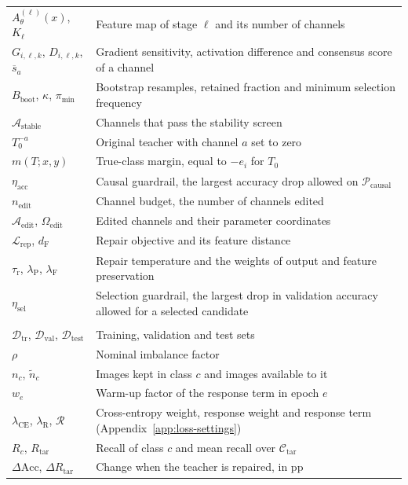 \documentclass[review,number,sort&compress]{elsarticle}
\theoremstyle{definition}
\begin{document}
{\begin{longtable}{@{}>{\raggedright\arraybackslash}p{}%
>{\raggedright\arraybackslash}p{}@{}}
$A_\theta^{(\ell)}(x)$, $K_\ell$ & Feature map of stage $\ell$ and its number of channels \\
$G_{i,\ell,k}$, $D_{i,\ell,k}$, $\overline s_a$ & Gradient sensitivity, activation difference and consensus score of a channel \\
$B_{\mathrm{boot}}$, $\kappa$, $\pi_{\min}$ & Bootstrap resamples, retained fraction and minimum selection frequency \\
$\mathcal A_{\mathrm{stable}}$ & Channels that pass the stability screen \\
$T_0^{-a}$ & Original teacher with channel $a$ set to zero \\
$m(T;x,y)$ & True-class margin, equal to $-e_i$ for $T_0$ \\
$\eta_{\mathrm{acc}}$ & Causal guardrail, the largest accuracy drop allowed on $\mathcal P_{\mathrm{causal}}$ \\
$n_{\mathrm{edit}}$ & Channel budget, the number of channels edited \\
$\mathcal A_{\mathrm{edit}}$, $\Omega_{\mathrm{edit}}$ & Edited channels and their parameter coordinates \\
$\mathcal L_{\mathrm{rep}}$, $d_{\mathrm F}$ & Repair objective and its feature distance \\
$\tau_{\mathrm r}$, $\lambda_{\mathrm P}$, $\lambda_{\mathrm F}$ & Repair temperature and the weights of output and feature preservation \\
$\eta_{\mathrm{sel}}$ & Selection guardrail, the largest drop in validation accuracy allowed for a selected candidate \\
\midrule
\multicolumn{2}{@{}l}{\textit{Experiments (Sections~\ref{sec:experimental-design} and~\ref{sec:results})}} \\
$\mathcal D_{\mathrm{tr}}$, $\mathcal D_{\mathrm{val}}$, $\mathcal D_{\mathrm{test}}$ & Training, validation and test sets \\
$\rho$ & Nominal imbalance factor \\
$n_c$, $\widetilde n_c$ & Images kept in class $c$ and images available to it \\
$w_e$ & Warm-up factor of the response term in epoch $e$ \\
$\lambda_{\mathrm{CE}}$, $\lambda_{\mathrm R}$, $\mathcal R$ & Cross-entropy weight, response weight and response term (Appendix~\ref{app:loss-settings}) \\
$R_c$, $R_{\mathrm{tar}}$ & Recall of class $c$ and mean recall over $\mathcal C_{\mathrm{tar}}$ \\
$\Delta\mathrm{Acc}$, $\Delta R_{\mathrm{tar}}$ & Change when the teacher is repaired, in pp \\
\end{longtable}
}
\end{document}
